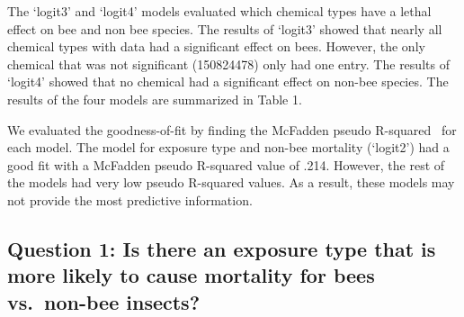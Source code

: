 \documentclass[
  12pt,
]{article}
\newenvironment{Shaded}{\begin{snugshade}}{\end{snugshade}}
\newcommand{\AttributeTok}[1]{\textcolor[rgb]{0.77,0.63,0.00}{#1}}
\newcommand{\CommentTok}[1]{\textcolor[rgb]{0.56,0.35,0.01}{\textit{#1}}}
\newcommand{\DecValTok}[1]{\textcolor[rgb]{0.00,0.00,0.81}{#1}}
\newcommand{\FunctionTok}[1]{\textcolor[rgb]{0.00,0.00,0.00}{#1}}
\newcommand{\NormalTok}[1]{#1}
\newcommand{\OtherTok}[1]{\textcolor[rgb]{0.56,0.35,0.01}{#1}}
\newcommand{\SpecialCharTok}[1]{\textcolor[rgb]{0.00,0.00,0.00}{#1}}
\newcommand{\StringTok}[1]{\textcolor[rgb]{0.31,0.60,0.02}{#1}}
\begin{document}
The `logit3' and `logit4' models evaluated which chemical types have a
lethal effect on bee and non bee species. The results of `logit3' showed
that nearly all chemical types with data had a significant effect on
bees. However, the only chemical that was not significant (150824478)
only had one entry. The results of `logit4' showed that no chemical had
a significant effect on non-bee species. The results of the four models
are summarized in Table 1.

We evaluated the goodness-of-fit by finding the McFadden pseudo
R-squared~ for each model. The model for exposure type and non-bee
mortality (`logit2') had a good fit with a McFadden pseudo R-squared
value of .214. However, the rest of the models had very low pseudo
R-squared values. As a result, these models may not provide the most
predictive information.

\hypertarget{question-1-is-there-an-exposure-type-that-is-more-likely-to-cause-mortality-for-bees-vs.-non-bee-insects}{%
\subsection{Question 1: Is there an exposure type that is more likely to
cause mortality for bees vs.~non-bee
insects?}\label{question-1-is-there-an-exposure-type-that-is-more-likely-to-cause-mortality-for-bees-vs.-non-bee-insects}}

\begin{Shaded}
\end{Shaded}
\end{document}
